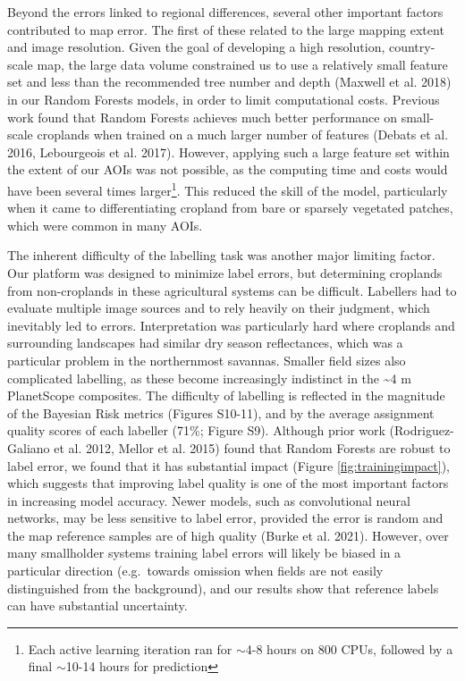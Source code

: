 \documentclass[11pt,a4paper]{article}
\begin{document}
Beyond the errors linked to regional differences, several other
important factors contributed to map error. The first of these related
to the large mapping extent and image resolution. Given the goal of
developing a high resolution, country-scale map, the large data volume
constrained us to use a relatively small feature set and less than the
recommended tree number and depth (Maxwell et al. 2018) in our Random
Forests models, in order to limit computational costs. Previous work
found that Random Forests achieves much better performance on
small-scale croplands when trained on a much larger number of features
(Debats et al. 2016, Lebourgeois et al. 2017). However, applying such a
large feature set within the extent of our AOIs was not possible, as the
computing time and costs would have been several times
larger\footnote{Each active learning iteration ran for $\sim$4-8 hours on 800 CPUs, followed by a final $\sim$10-14 hours for prediction}.
This reduced the skill of the model, particularly when it came to
differentiating cropland from bare or sparsely vegetated patches, which
were common in many AOIs.

The inherent difficulty of the labelling task was another major limiting
factor. Our platform was designed to minimize label errors, but
determining croplands from non-croplands in these agricultural systems
can be difficult. Labellers had to evaluate multiple image sources and
to rely heavily on their judgment, which inevitably led to errors.
Interpretation was particularly hard where croplands and surrounding
landscapes had similar dry season reflectances, which was a particular
problem in the northernmost savannas. Smaller field sizes also
complicated labelling, as these become increasingly indistinct in the
\textasciitilde4 m PlanetScope composites. The difficulty of labelling
is reflected in the magnitude of the Bayesian Risk metrics (Figures
S10-11), and by the average assignment quality scores of each labeller
(71\%; Figure S9). Although prior work (Rodriguez-Galiano et al. 2012,
Mellor et al. 2015) found that Random Forests are robust to label error,
we found that it has substantial impact (Figure
\ref{fig:trainingimpact}), which suggests that improving label quality
is one of the most important factors in increasing model accuracy. Newer
models, such as convolutional neural networks, may be less sensitive to
label error, provided the error is random and the map reference samples
are of high quality (Burke et al. 2021). However, over many smallholder
systems training label errors will likely be biased in a particular
direction (e.g.~towards omission when fields are not easily
distinguished from the background), and our results show that reference
labels can have substantial uncertainty.
\end{document}
